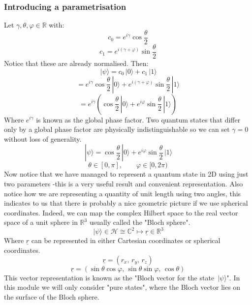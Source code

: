 \documentclass[12pt]{article}
\newcommand{\ket}[1]{\,|#1\rangle}
\begin{document}
\subsubsection*{Introducing a parametrisation}
Let \(\gamma,\theta,\varphi\in \mathbb{R}\) with:
\[c_0=e^{i\gamma}\cos\frac{\theta}{2}\]
\[c_1=e^{i(\gamma+\varphi)}\sin\frac{\theta}{2}\]
Notice that these are already normalised. Then:
\[\ket{\psi}=c_0\ket{0}+c_1\ket{1}\]
\[=e^{i\gamma}\cos\frac{\theta}{2}\ket{0}+e^{i(\gamma+\varphi)}\sin\frac{\theta}{2}\ket{1}\]
\[=e^{i\gamma}\left(\cos\frac{\theta}{2}\ket{0}+e^{i\varphi}\sin\frac{\theta}{2}\ket{1}\right)\]
Where \(e^{i\gamma}\) is known as the global phase factor. Two quantum states that differ only by a global phase factor are physically indistinguishable so we can set \(\gamma=0\) without loss of generality.
\[\ket{\psi}=\cos\frac{\theta}{2}\ket{0}+e^{i\varphi}\sin\frac{\theta}{2}\ket{1}\]
\[\theta\in [0,\pi],\qquad \varphi\in [0,2\pi)\]
Now notice that we have managed to represent a quantum state in 2D using just two parameters -this is a very useful result and convenient representation. Also notice how we are representing a quantity of unit length using two angles, this indicates to us that there is probably a nice geometric picture if we use spherical coordinates. Indeed, we can map the complex Hilbert space to the real vector space of a unit sphere in \(\mathbb{R}^3\) usually called the "Bloch sphere".
\[\ket{\psi}\in \mathcal{H}\cong \mathbb{C}^2\longmapsto \underline{r}\in \mathbb{R}^3\]
Where \(\underline{r}\) can be represented in either Cartesian coordinates or spherical coordinates.
\[\underline{r}=(r_x,\,r_y,\,r_z)\]
\[\underline{r}=(\sin\theta\cos\varphi,\,\sin\theta\sin\varphi,\,\cos\theta)\]
This vector representation is known as the "Bloch vector for the state \(\ket{\psi}\)". In this module we will only consider "pure states", where the Bloch vector lies on the surface of the Bloch sphere.
\end{document}
